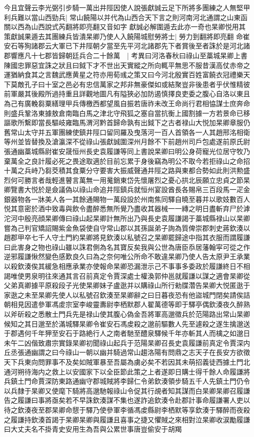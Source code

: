 今且宜聲云李光弼引步騎一萬出井陘因使人說張獻誠云足下所將多團練之人無堅甲利兵難以當山西勁兵|{
	常山饒陽以并代為山西合天下言之則河南河北通謂之山東函關以西為山西說式芮翻將即亮翻又音如字}
獻誠必解圍遁去此亦一奇也杲卿悦用其策獻誠果遁去其團練兵皆潰杲卿乃使人入饒陽城慰勞將士|{
	勞力到翻將即亮翻}
命崔安石等狥諸郡云大軍已下井陘朝夕當至先平河北諸郡先下者賞後至者誅於是河北諸郡響應凡十七郡皆歸朝廷兵合二十餘萬　|{
	考異曰河洛春秋曰祿山至藁城杲卿上書陳國忠罪惡宜誅之狀且曰鉞下才不世出天實縱之所向輒平無思不服昔漢高仗赤帝之運猶納食其之言魏武應黄星之符亦用荀彧之策又曰今河北殷實百姓富饒衣冠禮樂天下莫敵孔子曰十室之邑必有忠信萬家之邦非無豪傑如或結聚豈非後患者乎伏惟精彼前軍嚴其後殿所過持重且詳觀地圖凡有隘狹必加防遏慎擇良吏委之腹心自洛以東且為己有廣輓芻粟繕理甲兵傳檄西都望風自振若唐祚未改王命尚行君相恊謀士庶奔命則盛兵鞏洛東據敖倉南臨白馬之津北守飛狐之塞自當抗衡上國割據一方若景命已移謳歌所繫即當長驅岐雍臨馬渭河黔首歸命孰有出鉞下之古者禄山大悦加杲卿章服仍舊常山太守并五軍團練使鎮井陘口留同羅及曳落河一百人首領各一人其趙邢洺相衛等州並皆替換及滄瀛深不從祿山張獻誠圍深州月餘不下前趙州司戶包處遂前原氏尉張通幽藁城縣尉崔安晟恒州長史袁履謙等同上書說杲卿曰明公身荷寵光位居守牧乃棄萬全之良計履必死之畏途取適於目前忘累于身後竊為明公不取今若拒祿山之命招十萬之兵峙乃芻茭積其食粟分守要害大振威聲通井陘之路與東都合勢如此則洪勲盛烈何可勝言者哉輕進瞽言萬無一用䰟銷東岱先懷屠烈之憂心拱北辰願立忠貞之節杲卿覽書大悦於是僉議偽以祿山命追井陘鎮兵就恒州宴設酋長各賜帛三百段馬一疋金銀器物各一牀美人各一其餘通賜物一萬段設於州南焦同驛自曉至暮并以歌妓數百人悦其意密於酒中致毒與飲令盡醉悉無所覺乃盡收其器械一一縳之明日盡斬弃尸於滹沱河中殷亮顔杲卿傳曰祿山起杲卿計無所出乃與長史袁履謙謁于藁城縣禄山以杲卿嘗為己判官矯詔賜紫金魚袋使自守常山郡以其孫誕弟子詢為質俾崇郡刺史蔣欽湊以趙郡甲卒七千人守土門約杲卿將見欽湊以私號召之杲卿罷歸途中指其衣服而謂履謙曰此害身之物也祿山雖以誅君側為名其寶反矣我與公世為唐臣忝居藩翰寜可從之作逆邪履謙愀然變色感歎良久曰為之奈何唯公所命不敢違杲卿乃使人告太原尹王承業以殺欽湊俟其緩急相應承業亦使報命杲卿恐漏泄示己不事事多委政於履謙終日不相謁唯使男泉明往來通其言召前真定令賈深處士權渙郭仲邕就履謙以謀之適會杲卿從父弟真卿據平原殺段子光使杲卿妹子盧逖并以購祿山所行勑牒濳告杲卿大悦匿逖于家逖之未至杲卿先使人以私號召欽湊至杲卿辭之曰日暮夜恐有他盜城門閉矣請俟詰朝相見因遣參軍馮䖍宗室李峻靈夀尉李栖默郡人翟萬德等即于驛亭偶欽湊夜久醉熟以斧斫殺之悉散土門兵先是禄山使其腹心偽金吾將軍高邈徵兵於范陽路出常山杲卿候知之其日邈至於滿城驛杲卿令崔安石馮䖍殺之邈前驅數人先至遽殺之遂生擒邈送于郡遇何千年狎至安石于路絶行人之南者馳至醴泉驛候千年亦斬其人而檎之如邈日未午二凶偕致肅宗實錄杲卿初聞祿山起兵于范陽杲卿召長史袁履謙前真定令賈深内丘丞張通幽謂之曰今祿山一朝以幽并騎過常山趨洛陽有問鼎之志天子在長安方欲徵天下兵東向問罪事不及矣如賊軍暴至吾屬為虜必矣不若因其未萌招義徒西據土門北通河朔待海内之救上以安國家下以全臣節此策之上者遂即日購士得千餘人命履謙將兵鎮土門命賈深防東路通幽守郡城賊將李歸仁令弟欽湊領步騎五千人先鎮土門仍令以兵隸于杲卿又使麾下騎將高邈馳報祿山令促其行覘者知其謀而白杲卿杲卿召履謙告之履謙曰事將亟矣若不早誅欽湊謀不集也遂詐追欽湊令赴郡計事命履謙署人吏以待之欽湊夜至郡杲卿命憇于驛乃使參軍李循馮䖍縣尉李栖默等享欽湊于驛醉而夜殺之履謙持欽湊首謁于杲卿杲卿與履謙且喜事之捷又懼賊之來相對泣杲卿收涙勵履謙曰大丈夫名不掛青史安用生為吾與公累世事唐豈偷安于胡羯}
